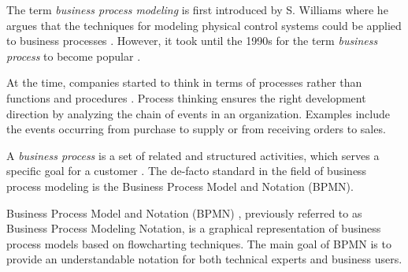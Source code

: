 The term \emph{business process modeling} is first introduced by S. Williams \cite{swill} where he argues that the techniques for modeling physical control systems could be applied to business processes \cite{tdj03}. However, it took until the 1990s for the term \emph{business process} to become popular \cite{Hook11}. 

At the time, companies started to think in terms of processes rather than functions and procedures \cite{wiki3}. Process thinking ensures the right development direction by analyzing the chain of events in an organization. Examples include the events occurring from purchase to supply or from receiving orders to sales.

 
A \emph{business process} is a set of related and structured activities, which serves a specific goal for a customer \cite{wiki3}. The de-facto standard in the field of business process modeling is the Business Process Model and Notation (BPMN). 

Business Process Model and Notation (BPMN) \cite{BPMN20}, previously referred to as Business Process Modeling Notation, is a graphical representation of business process models based on flowcharting techniques. The main goal of BPMN is to provide an understandable notation for both technical experts and business users. %



